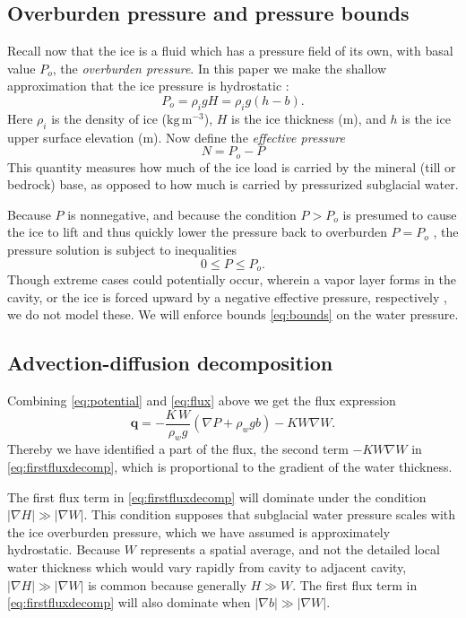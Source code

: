\documentclass[11pt,final]{amsart}%
\newcommand\bq{\mathbf{q}}
\newcommand{\grad}{\nabla}
\begin{document}
\subsection*{Overburden pressure and pressure bounds}  Recall now that the ice is a fluid which has a pressure field of its own, with basal value $P_o$, the \emph{overburden pressure}.  In this paper we make the shallow approximation that the ice pressure is hydrostatic \citep{GreveBlatter2009}:
\begin{equation} \label{eq:hydrostatic}
  P_o = \rho_i g H = \rho_i g (h-b).
\end{equation}
Here $\rho_i$ is the density of ice ($\text{kg}\,\text{m}^{-3}$), $H$ is the ice thickness (m), and $h$ is the ice upper surface elevation (m).  Now define the \emph{effective pressure}
\begin{equation}
N = P_o - P\label{eq:effective}
\end{equation}
This quantity measures how much of the ice load is carried by the mineral (till or bedrock) base, as opposed to how much is carried by pressurized subglacial water.

Because $P$ is nonnegative, and because the condition $P>P_o$ is presumed to cause the ice to lift and thus quickly lower the pressure back to overburden $P=P_o$ \citep{Schoofetal2012}, the pressure solution is subject to inequalities
\begin{equation}
0 \le P \le P_o. \label{eq:bounds}
\end{equation}
Though extreme cases could potentially occur, wherein a vapor layer forms in the cavity, or the ice is forced upward by a negative effective pressure, respectively \citep{Schoofetal2012}, we do not model these.  We will enforce bounds \eqref{eq:bounds} on the water pressure.


\subsection*{Advection-diffusion decomposition}  Combining \eqref{eq:potential} and \eqref{eq:flux} above we get the flux expression
\begin{equation}
  \bq = - \frac{K\, W}{\rho_w g} \left(\grad P + \rho_w g b\right) - K W \grad W. \label{eq:firstfluxdecomp}
\end{equation}
Thereby we have identified a part of the flux, the second term $-K W \grad W$ in \eqref{eq:firstfluxdecomp}, which is proportional to the gradient of the water thickness.

The first flux term in \eqref{eq:firstfluxdecomp} will dominate under the condition $|\grad H| \gg |\grad W|$.  This condition supposes that subglacial water pressure scales with the ice overburden pressure, which we have assumed is approximately hydrostatic.  Because $W$ represents a spatial average, and not the detailed local water thickness which would vary rapidly from cavity to adjacent cavity, $|\grad H| \gg |\grad W|$ is common because generally $H\gg W$.  The first flux term in \eqref{eq:firstfluxdecomp} will also dominate when $|\grad b| \gg |\grad W|$. 
\end{document}
